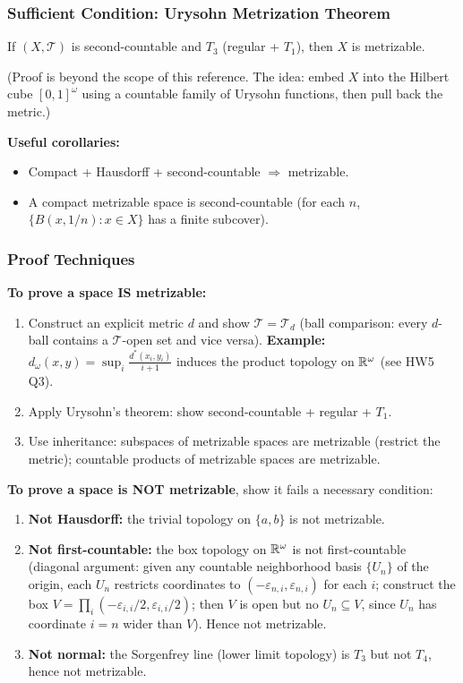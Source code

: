 \documentclass{article}
\begin{document}
\subsubsection*{Sufficient Condition: Urysohn Metrization Theorem}

\begin{theorem}[Urysohn]
  If $(X, \mathcal{T})$ is second-countable and $T_3$ (regular + $T_1$),
  then $X$ is metrizable.
\end{theorem}
(Proof is beyond the scope of this reference. The idea: embed $X$ into the
  Hilbert cube $[0,1]^\omega$ using a countable family of Urysohn functions,
then pull back the metric.)

\textbf{Useful corollaries:}
\begin{itemize}
  \item Compact + Hausdorff + second-countable $\Rightarrow$ metrizable.
  \item A compact metrizable space is second-countable
    (for each $n$, $\{B(x, 1/n) : x \in X\}$ has a finite subcover).
\end{itemize}

\subsubsection*{Proof Techniques}

\textbf{To prove a space IS metrizable:}
\begin{enumerate}
  \item Construct an explicit metric $d$ and show $\mathcal{T} = \mathcal{T}_d$
    (ball comparison: every $d$-ball contains a $\mathcal{T}$-open
    set and vice versa).
    \textbf{Example:} $d_\omega(x,y) = \sup_i \frac{d^*(x_i,y_i)}{i+1}$
    induces the product topology on $\mathbb{R}^\omega$ (see HW5 Q3).
  \item Apply Urysohn's theorem: show second-countable + regular + $T_1$.
  \item Use inheritance: subspaces of metrizable spaces are metrizable
    (restrict the metric); countable products of metrizable spaces
    are metrizable.
\end{enumerate}

\textbf{To prove a space is NOT metrizable}, show it fails a
necessary condition:
\begin{enumerate}
  \item \textbf{Not Hausdorff:} the trivial topology on $\{a,b\}$ is
    not metrizable.
  \item \textbf{Not first-countable:} the box topology on $\mathbb{R}^\omega$ is not
    first-countable (diagonal argument: given any countable neighborhood basis
      $\{U_n\}$ of the origin, each $U_n$ restricts coordinates to
      $(-\varepsilon_{n,i}, \varepsilon_{n,i})$ for each $i$; construct the box
      $V = \prod_i (-\varepsilon_{i,i}/2, \varepsilon_{i,i}/2)$; then
      $V$ is open but
    no $U_n \subseteq V$, since $U_n$ has coordinate $i=n$ wider than $V$).
    Hence not metrizable.
  \item \textbf{Not normal:} the Sorgenfrey line (lower limit topology) is
    $T_3$ but not $T_4$, hence not metrizable.
\end{enumerate}
\end{document}
